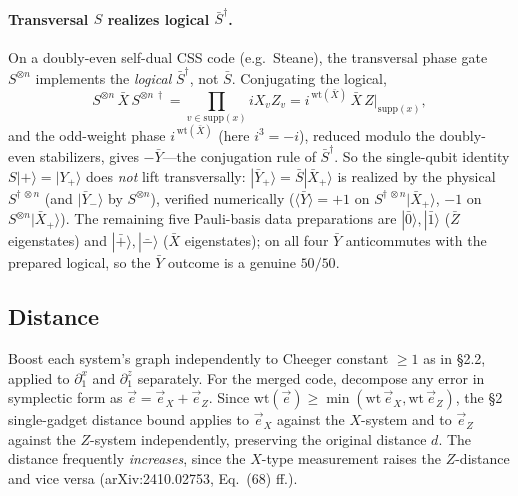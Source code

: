 \documentclass[a4paper, 12pt]{article}
\begin{document}
\paragraph{Transversal $S$ realizes logical $\bar S^\dagger$.}
On a doubly-even self-dual CSS code (e.g.\ Steane), the transversal phase gate $S^{\otimes n}$
implements the \emph{logical} $\bar S^\dagger$, not $\bar S$. Conjugating the logical,
\begin{equation}
S^{\otimes n}\,\bar X\,S^{\otimes n\,\dagger}
= \prod_{v\in\mathrm{supp}(x)} iX_vZ_v
= i^{\,\mathrm{wt}(\bar X)}\,\bar X\,Z|_{\mathrm{supp}(x)},
\end{equation}
and the odd-weight phase $i^{\,\mathrm{wt}(\bar X)}$ (here $i^3 = -i$), reduced modulo the
doubly-even stabilizers, gives $-\bar Y$---the conjugation rule of $\bar S^\dagger$. So the
single-qubit identity $S|+\rangle = |Y_+\rangle$ does \emph{not} lift transversally:
$|\bar Y_+\rangle = \bar S|\bar X_+\rangle$ is realized by the physical $S^{\dagger\,\otimes n}$
(and $|\bar Y_-\rangle$ by $S^{\otimes n}$), verified numerically
($\langle\bar Y\rangle = +1$ on $S^{\dagger\,\otimes n}|\bar X_+\rangle$, $-1$ on
$S^{\otimes n}|\bar X_+\rangle$). The remaining five Pauli-basis data preparations are
$|\bar 0\rangle, |\bar 1\rangle$ ($\bar Z$ eigenstates) and $|\bar +\rangle, |\bar -\rangle$
($\bar X$ eigenstates); on all four $\bar Y$ anticommutes with the prepared logical, so the
$\bar Y$ outcome is a genuine $50/50$.

\subsection{Distance}
Boost each system's graph independently to Cheeger constant $\geq 1$ as in \S 2.2, applied to
$\partial_1^{x}$ and $\partial_1^{z}$ separately. For the merged code, decompose any error in
symplectic form as $\vec e = \vec e_X + \vec e_Z$. Since
$\mathrm{wt}(\vec e) \geq \min(\mathrm{wt}\,\vec e_X, \mathrm{wt}\,\vec e_Z)$, the \S 2
single-gadget distance bound applies to $\vec e_X$ against the $X$-system and to $\vec e_Z$
against the $Z$-system independently, preserving the original distance $d$. The distance
frequently \emph{increases}, since the $X$-type measurement raises the $Z$-distance and vice
versa (arXiv:2410.02753, Eq.~(68) ff.).
\end{document}
